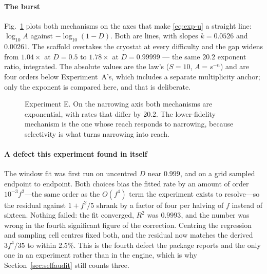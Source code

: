 \documentclass[conference]{IEEEtran}
\theoremstyle{definition}
\begin{document}
\paragraph{The burst} Fig.~\ref{fig:burst} plots both mechanisms on the axes that
make \eqref{eq:exp-u} a straight line: $\log_{10}A$ against
$-\log_{10}(1-D)$. Both are lines, with slopes $k=0.0526$ and $0.00261$. The
scaffold overtakes the cryostat at every difficulty and the gap widens from
$1.04\times$ at $D=0.5$ to $1.78\times$ at $D=0.99999$ --- the same $20.2$
exponent ratio, integrated. The absolute values are the law's ($S=10$,
$A=s^{-n}$) and are four orders below Experiment~A's, which includes a separate
multiplicity anchor; only the exponent is compared here, and that is deliberate.

\begin{figure}[t]
\centering
{}
\caption{Experiment E. On the narrowing axis both mechanisms are exponential, with
rates that differ by \num{20.2}. The lower-fidelity mechanism is the one whose
reach responds to narrowing, because selectivity is what turns narrowing into
reach.}
\label{fig:burst}
\end{figure}

\paragraph{A defect this experiment found in itself} The window fit was first run
on uncentred $D$ near $0.999$, and on a grid sampled endpoint to endpoint. Both
choices bias the fitted rate by an amount of order $10^{-3}f^{2}$---the same order
as the $O(f^{4})$ term the experiment exists to resolve---so the residual against
$1+f^{2}/5$ shrank by a factor of four per halving of $f$ instead of sixteen.
Nothing failed: the fit converged, $R^{2}$ was $0.9993$, and the number was wrong in
the fourth significant figure of the correction. Centring the regression and
sampling cell centres fixed both, and the residual now matches the derived
$3f^{4}/35$ to within \num{2.5}\%. This is the fourth defect the package reports and
the only one in an experiment rather than in the engine, which is why
Section~\ref{sec:selfaudit} still counts three.
\end{document}
